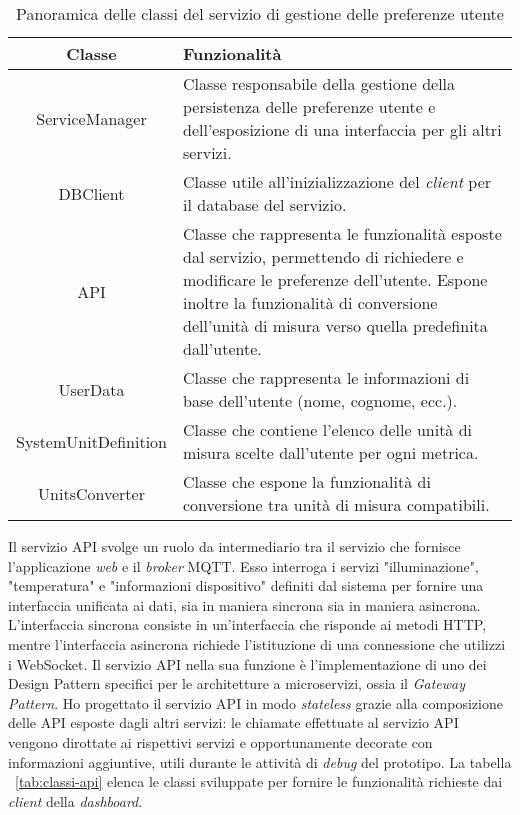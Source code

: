 \begin{table}[!h]
\caption{Panoramica delle classi del servizio di gestione delle preferenze utente}
\label{tab:classi-user}
\begin{tabularx}{\linewidth}{|c|X|}
\hline
\textbf{Classe} & \textbf{Funzionalità} \\
\hline
ServiceManager & Classe responsabile della gestione della persistenza delle preferenze utente e dell'esposizione di una interfaccia per gli altri servizi. \\
\hline
DBClient & Classe utile all'inizializzazione del \emph{client} per il database del servizio. \\
\hline
API & Classe che rappresenta le funzionalità esposte dal servizio, permettendo di richiedere e modificare le preferenze dell'utente. Espone inoltre la funzionalità di conversione dell'unità di misura verso quella predefinita dall'utente. \\
\hline
UserData & Classe che rappresenta le informazioni di base dell'utente (nome, cognome, ecc.). \\
\hline
SystemUnitDefinition & Classe che contiene l'elenco delle unità di misura scelte dall'utente per ogni metrica. \\
\hline
UnitsConverter & Classe che espone la funzionalità di conversione tra unità di misura compatibili. \\
\hline
\end{tabularx}
\end{table}


Il servizio API svolge un ruolo da intermediario tra il servizio che fornisce l'applicazione \emph{web} e il \emph{broker} MQTT.
Esso interroga i servizi "illuminazione", "temperatura" e "informazioni dispositivo"  definiti dal sistema per fornire una interfaccia unificata ai dati, sia in maniera sincrona sia in maniera asincrona.
L'interfaccia sincrona consiste in un'interfaccia che risponde ai metodi HTTP, mentre l'interfaccia asincrona richiede l'istituzione di una connessione che utilizzi i WebSocket.
Il servizio API nella sua funzione è l'implementazione di uno dei Design Pattern specifici per le architetture a microservizi, ossia il \emph{Gateway Pattern}.
Ho progettato il servizio API in modo \emph{stateless} grazie alla composizione delle API esposte dagli altri servizi: le chiamate effettuate al servizio API vengono dirottate ai rispettivi servizi e opportunamente decorate con informazioni aggiuntive, utili durante le attività di \emph{debug} del prototipo.
La tabella ~\ref{tab:classi-api} elenca le classi sviluppate per fornire le funzionalità richieste dai \emph{client} della \emph{dashboard}.

